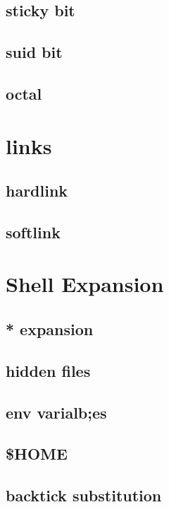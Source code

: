 \documentclass[hyperref={pdfpagelabels=false}]{beamer}
\begin{document}
\subsection{sticky bit}
\subsection{suid bit}
\subsection{octal}
\section{links}
\subsection{hardlink}
\subsection{softlink}
\section{Shell Expansion}
\subsection{* expansion}
\subsection{hidden files}
\subsection{env varialb;es}
\subsection{\$HOME}
\subsection{backtick substitution}
\end{document}

